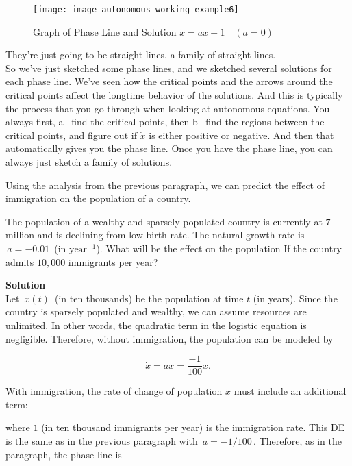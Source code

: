 \begin{enumerate}
  \begin{figure}[ht!]
    \centering
    \texttt{[image: image\_autonomous\_working\_example6]}
    \caption{Graph of Phase Line and Solution $\dot x = ax -1 \quad (a = 0)$}
  \end{figure}

  They're just going to be straight lines,
  a family of straight lines. \\

  So we've just sketched some phase lines,
  and we sketched several solutions for each phase line.
  We've seen how the critical points and the arrows
  around the critical points affect the longtime behavior of the solutions.
  And this is typically the process that you go through when looking at autonomous equations.
  You always first, a-- find the critical points, then b--
  find the regions between the critical points,
  and figure out if $\dot x$ is either positive or negative.
  And then that automatically gives you the phase line.
  Once you have the phase line, you can always just sketch a family of solutions.
\end{enumerate}

Using the analysis from the previous paragraph,
we can predict the effect of immigration on the population of a country.

\begin{example}
  The population of a wealthy and sparsely populated country is currently at
  $7$ million and is declining from low birth rate.
  The natural growth rate is $\, a=−0.01\,$ (in $\text{year}^{−1}$).
  What will be the effect on the population If the country admits $10,000$ immigrants per year? 
\end{example}

\textbf{Solution }\\
Let $\, x(t) \,$ (in ten thousands) be the population at time $t$ (in years).
Since the country is sparsely populated and wealthy, we can assume resources are unlimited.
In other words, the quadratic term in the logistic equation is negligible.
Therefore, without immigration, the population can be modeled by

\begin{equation*}
  \dot x = ax = \frac{-1}{100} x. 
\end{equation*}

With immigration, the rate of change of population $\dot x$ must include an additional term:

where $1$ (in ten thousand immigrants per year) is the immigration rate.
This DE is the same as in the previous paragraph with $\, a=−1/100\,$.
Therefore, as in the paragraph, the phase line is

